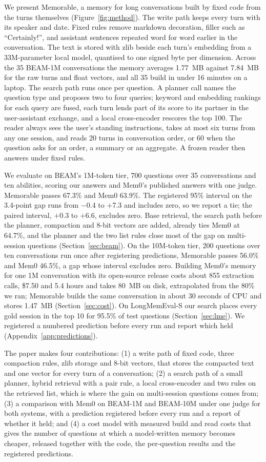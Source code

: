 We present Memorable, a memory for long conversations built by fixed code from the turns themselves (Figure~\ref{fig:method}). The write path keeps every turn with its speaker and date. Fixed rules remove markdown decoration, filler such as ``Certainly!'', and assistant sentences repeated word for word earlier in the conversation. The text is stored with zlib beside each turn's embedding from a 33M-parameter local model, quantised to one signed byte per dimension. Across the 35 BEAM-1M conversations the memory averages 1.77~MB against 7.84~MB for the raw turns and float vectors, and all 35 build in under 16 minutes on a laptop. The search path runs once per question. A planner call names the question type and proposes two to four queries; keyword and embedding rankings for each query are fused, each turn lends part of its score to its partner in the user-assistant exchange, and a local cross-encoder rescores the top 100. The reader always sees the user's standing instructions, takes at most six turns from any one session, and reads 20 turns in conversation order, or 60 when the question asks for an order, a summary or an aggregate. A frozen reader then answers under fixed rules.

We evaluate on BEAM's 1M-token tier, 700 questions over 35 conversations and ten abilities, scoring our answers and Mem0's published answers with one judge. Memorable passes 67.3\% and Mem0 63.9\%. The registered 95\% interval on the 3.4-point gap runs from $-$0.4 to $+$7.3 and includes zero, so we report a tie; the paired interval, $+$0.3 to $+$6.6, excludes zero. Base retrieval, the search path before the planner, compaction and 8-bit vectors are added, already ties Mem0 at 64.7\%, and the planner and the two list rules close most of the gap on multi-session questions (Section~\ref{sec:beam}). On the 10M-token tier, 200 questions over ten conversations run once after registering predictions, Memorable passes 56.0\% and Mem0 46.5\%, a gap whose interval excludes zero. Building Mem0's memory for one 1M conversation with its open-source release costs about 855 extraction calls, \$7.50 and 5.4 hours and takes 80~MB on disk, extrapolated from the 80\% we ran; Memorable builds the same conversation in about 30 seconds of CPU and stores 1.47~MB (Section~\ref{sec:cost}). On LongMemEval-S our search places every gold session in the top 10 for 95.5\% of test questions (Section~\ref{sec:lme}). We registered a numbered prediction before every run and report which held (Appendix~\ref{app:predictions}).

The paper makes four contributions: (1) a write path of fixed code, three compaction rules, zlib storage and 8-bit vectors, that stores the compacted text and one vector for every turn of a conversation; (2) a search path of a small planner, hybrid retrieval with a pair rule, a local cross-encoder and two rules on the retrieved list, which is where the gain on multi-session questions comes from; (3) a comparison with Mem0 on BEAM-1M and BEAM-10M under one judge for both systems, with a prediction registered before every run and a report of whether it held; and (4) a cost model with measured build and read costs that gives the number of questions at which a model-written memory becomes cheaper, released together with the code, the per-question results and the registered predictions.
